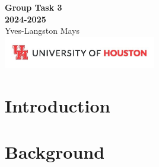 \documentclass{report}
\begin{document}
\begin{titlepage}
    \centering
    \vspace*{5cm}
    {\Huge \textbf{Group Task 3\\[0.5em] 2024-2025}} \\[1.5em]
    {\Large Yves-Langston Mays} \\[2.5em]
    \vfill
    \includegraphics[width=0.5\textwidth]{UHLogo_Long.png}
    \vspace{0.8cm}
\end{titlepage}

\begingroup
\let\clearpage\relax
\tableofcontents
\endgroup
\relax
\relax

\newpage

\chapter{Introduction}\label{introduction}

\chapter{Background}\label{background}
\end{document}
